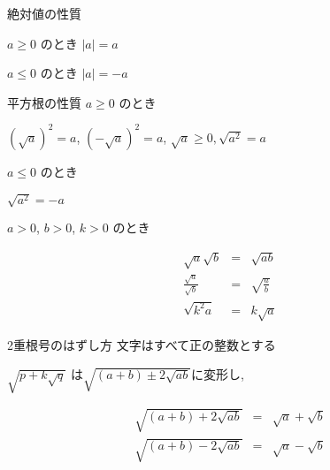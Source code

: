 \documentclass[aspectratio=169, 12pt]{beamer}
\begin{document}
\begin{frame}{絶対値の性質}
    \begin{center}
        $ a \geq 0 $ のとき $|a|=a$ \par
        $ a \leq 0 $ のとき $|a|=-a$ \par
    \end{center}
\end{frame}
\begin{frame}{平方根の性質}
    $ a \geq 0 $ のとき \par
    \begin{center}
        $(\sqrt{a})^2=a$, $(-\sqrt{a})^2=a$, $\sqrt{a}\geq 0, \sqrt{a^2}=a$
    \end{center}
    $ a \leq 0 $ のとき \par
    \begin{center}
        $\sqrt{a^2}=-a$
    \end{center}
    $ a > 0$, $b>0$, $k>0$ のとき \par
    \begin{eqnarray*}
        \sqrt{a}\sqrt{b}&=&\sqrt{ab} \\
        \frac{\sqrt{a}}{\sqrt{b}}&=&\sqrt{\frac{a}{b}} \\
        \sqrt{k^2a}&=&k\sqrt{a}
    \end{eqnarray*}
\end{frame}
\begin{frame}{2重根号のはずし方}
    文字はすべて正の整数とする \par
    $\sqrt{p+k\sqrt{q}}$ は$\sqrt{(a+b)\pm 2\sqrt{ab}}$に変形し, \par
    \begin{eqnarray*}
        \sqrt{(a+b)+2\sqrt{ab}}&=&\sqrt{a}+\sqrt{b} \\
        \sqrt{(a+b)-2\sqrt{ab}}&=&\sqrt{a}-\sqrt{b}
    \end{eqnarray*}
\end{frame}
\end{document}
